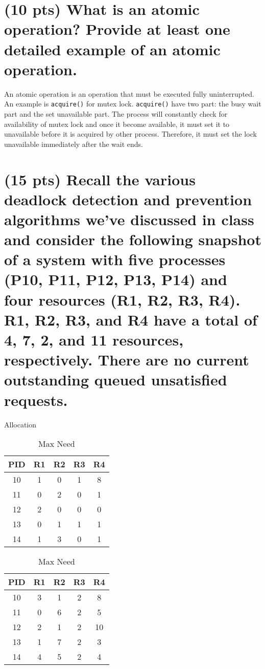 \documentclass{article}
\begin{document}
\section{(10 pts) What is an atomic operation? Provide at least one detailed example of an atomic operation.}
An atomic operation is an operation that must be executed fully uninterrupted.
An example is \texttt{acquire()} for mutex lock. \texttt{acquire()} have two part: the busy wait part and the set unavailable part.
The process will constantly check for availability of mutex lock and once it become available, it must set it to unavailable before
 it is acquired by other process. Therefore, it must set the lock unavailable immediately after the wait ends.

\section{(15 pts) Recall the various deadlock detection and prevention algorithms we’ve discussed in class and consider the following snapshot of a system with five processes (P10, P11, P12, P13, P14) and four resources (R1, R2, R3, R4).  R1, R2, R3, and R4 have a total of 4, 7, 2, and 11 resources, respectively.  There are no current outstanding queued unsatisfied requests.}
\begin{table}[H]
  \begin{minipage}{.5\textwidth}
    \centering
  \caption{Allocation}
  \begin{tabular}{c|cccc}
    \toprule
    PID & R1 & R2 & R3 & R4\\
    \midrule
    10      & 1 & 0 & 1 & 8 \\
    11      & 0 & 2 & 0 & 1 \\
    12      & 2 & 0 & 0 & 0 \\
    13      & 0 & 1 & 1 & 1 \\
    14      & 1 & 3 & 0 & 1 \\
    \bottomrule
  \end{tabular}
  \label{tbl:4_1}
  \end{minipage}
  \begin{minipage}{.5\textwidth}
    \centering
  \caption{Max Need}
  \begin{tabular}{c|cccc}
    \toprule
    PID & R1 & R2 & R3 & R4\\
    \midrule
    10      & 3 & 1 & 2 & 8 \\
    11      & 0 & 6 & 2 & 5 \\
    12      & 2 & 1 & 2 & 10 \\
    13      & 1 & 7 & 2 & 3 \\
    14      & 4 & 5 & 2 & 4 \\
    \bottomrule
  \end{tabular}
  \label{tbl:4_2}
  \end{minipage}
\end{table}
\end{document}
